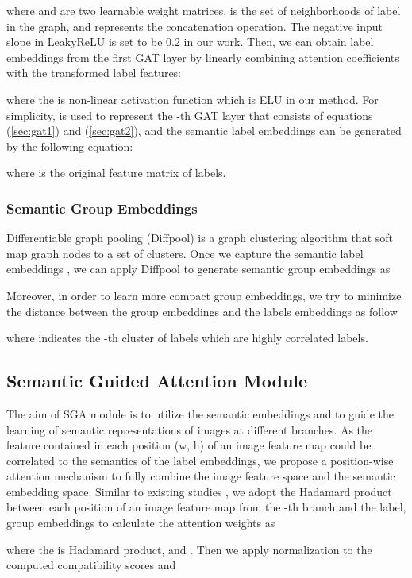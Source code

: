 \documentclass{article} \usepackage{nips14submit_e,times}
\begin{document}
where  and  are two learnable weight matrices,
 is the set of neighborhoods of label  in the graph,
and  represents the concatenation operation.
The negative input slope in LeakyReLU is set to be 0.2 in our work.
Then, we can obtain label embeddings  from the first GAT layer
by linearly combining attention coefficients  with the transformed label features:

where the  is non-linear activation function which is ELU in our method.
For simplicity,  is used to represent the -th
GAT layer that consists of equations (\ref{sec:gat1}) and (\ref{sec:gat2}),
and the semantic label embeddings  can be generated by the following equation:

where  is the original feature matrix of labels.


\subsubsection{Semantic Group Embeddings}
Differentiable graph pooling (Diffpool)\cite{NIPS18:Diffpool} is a graph clustering algorithm
that soft map graph nodes to a set of clusters.
Once we capture the semantic label embeddings , we can apply Diffpool to generate semantic group embeddings  as


Moreover, in order to learn more compact group embeddings,
we try to minimize the distance between the group embeddings  and the labels embeddings  as follow

where  indicates the -th cluster of labels which are highly correlated labels.




\subsection{Semantic Guided Attention Module}


The aim of SGA module is
to utilize the semantic embeddings  and  to guide the
learning of semantic representations of images at different
branches. As the feature contained in each position (w, h)
of an image feature map could be correlated to the semantics
of the label embeddings, we propose a position-wise attention
mechanism to fully combine the image feature space and the
semantic embedding space. Similar to existing studies \cite{ICLR2017:HPLBP, ICCV2019:ssgrl},
we adopt the Hadamard product between each position  of an image feature map from the -th branch and the label, group
embeddings to calculate the attention weights as

where the  is Hadamard product,  and . Then we apply normalization to the computed compatibility scores  and 
\end{document}
